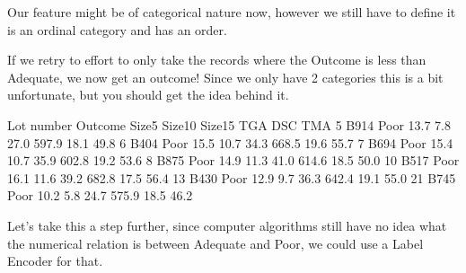\documentclass[letterpaper,10pt,english]{jupyterBook}
\begin{document}
\sphinxAtStartPar
Our feature might be of categorical nature now, however we still have to define it is an ordinal category and has an order.

\begin{sphinxVerbatim}[commandchars=\\\{\}]
  \PYG{p}{[} \PYG{p}{]}
\end{sphinxVerbatim}

\sphinxAtStartPar
If we retry to effort to only take the records where the Outcome is less than Adequate, we now get an outcome!
Since we only have 2 categories this is a bit unfortunate, but you should get the idea behind it.

\begin{sphinxVerbatim}[commandchars=\\\{\}]
\PYG{p}{[}\PYG{p}{]}
\end{sphinxVerbatim}

\begin{sphinxVerbatim}[commandchars=\\\{\}]
   Lot number Outcome  Size5  Size10  Size15    TGA   DSC   TMA
5        B914    Poor   13.7     7.8    27.0  597.9  18.1  49.8
6        B404    Poor   15.5    10.7    34.3  668.5  19.6  55.7
7        B694    Poor   15.4    10.7    35.9  602.8  19.2  53.6
8        B875    Poor   14.9    11.3    41.0  614.6  18.5  50.0
10       B517    Poor   16.1    11.6    39.2  682.8  17.5  56.4
13       B430    Poor   12.9     9.7    36.3  642.4  19.1  55.0
21       B745    Poor   10.2     5.8    24.7  575.9  18.5  46.2
\end{sphinxVerbatim}

\sphinxAtStartPar
Let’s take this a step further, since computer algorithms still have no idea what the numerical relation is between Adequate and Poor, we could use a Label Encoder for that.

\begin{sphinxVerbatim}[commandchars=\\\{\}]
   
\end{sphinxVerbatim}
\end{document}

